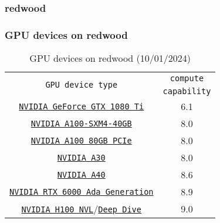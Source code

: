 \subsubsection{redwood}
\begin{frame}
	\frametitle{GPU devices on redwood}	
\begin{table}[H]
   \begin{center}
     \begin{tabular}{c|c}
       \multirow{2}{*}{\texttt{GPU device type}} & \texttt{compute} \\
                                                 & \texttt{capability} \\
       \hline
       \href{https://www.nvidia.com/en-us/geforce/10-series/\#1080-ti-spec}{\small{\texttt{NVIDIA GeForce GTX 1080 Ti}}}    &  \small{6.1}  \\
       \href{https://www.nvidia.com/content/dam/en-zz/Solutions/Data-Center/a100/pdf/nvidia-a100-datasheet-us-nvidia-1758950-r4-web.pdf}{\small{\texttt{NVIDIA A100-SXM4-40GB}}} &  \small{8.0} \\
	     \href{https://www.nvidia.com/content/dam/en-zz/Solutions/Data-Center/a100/pdf/nvidia-a100-datasheet-us-nvidia-1758950-r4-web.pdf}{\small{\texttt{NVIDIA A100 80GB PCIe}}} &  \small{8.0} \\
	     \href{https://www.nvidia.com/content/dam/en-zz/Solutions/data-center/products/a30-gpu/pdf/a30-datasheet.pdf}{\small{\texttt{NVIDIA A30}}}   &  \small{8.0} \\
	     \href{https://images.nvidia.com/content/Solutions/data-center/a40/nvidia-a40-datasheet.pdf}{\small{\texttt{NVIDIA A40}}} &  \small{8.6} \\
	     \href{https://www.nvidia.com/content/dam/en-zz/Solutions/design-visualization/rtx-6000/proviz-print-rtx6000-datasheet-web-2504660.pdf}{\small{\texttt{NVIDIA RTX 6000 Ada Generation}}}&  \small{8.9} \\
	     \href{https://www.nvidia.com/en-us/data-center/h100/}{\texttt{NVIDIA H100 NVL}}/\href{https://www.nvidia.com/content/dam/en-zz/Solutions/Data-Center/h100/PB-11773-001\_v01.pdf}{\small{\texttt{Deep Dive}}} &  \small{9.0} \\
        \hline
     \end{tabular}
   \end{center}	   
   \caption{GPU devices on redwood (10/01/2024)}
\end{table}	   
\end{frame}	
